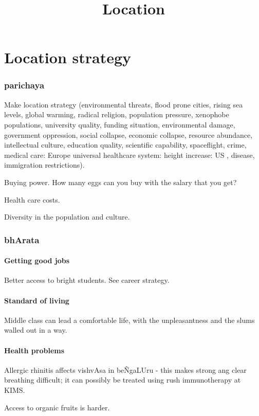 \documentclass[oneside, article]{memoir}
\title{Location}
\author{}
\begin{document}
\maketitle

\part{Location strategy}
\section{parichaya}
Make location strategy (environmental threats, flood prone cities, rising sea levels, global warming, radical religion, population pressure, xenophobe populations, university quality, funding situation, environmental damage, government oppression, social collapse, economic collapse, resource abundance, intellectual culture, education quality, scientific capability, spaceflight, crime, medical care: Europe universal healthcare system: height increase: US , disease, immigration restrictions).

Buying power. How many eggs can you buy with the salary that you get?

Health care costs.

Diversity in the population and culture.

\section{bhArata}
\subsection{Getting good jobs}
Better access to bright students. See career strategy.

\subsection{Standard of living}
Middle class can lead a comfortable life, with the unpleasantness and the slums walled out in a way.

\subsection{Health problems}
Allergic rhinitis affects vishvAsa in be\~NgaLUru - this makes strong ang clear breathing difficult; it can possibly be treated using rush immunotherapy at KIMS.

Access to organic fruits is harder.
\end{document}
